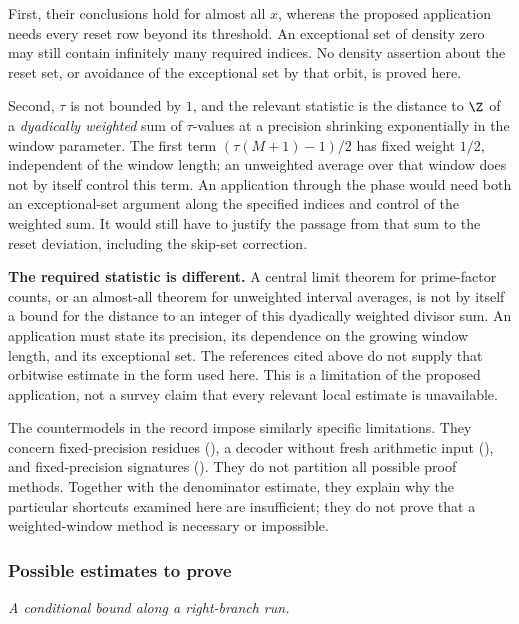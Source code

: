 First, their conclusions hold for almost all $x$, whereas the proposed
application needs every reset row beyond its threshold.  An
exceptional set of density zero may still contain infinitely many
required indices.  No density assertion about the reset set, or
avoidance of the exceptional set by that orbit, is proved here.

Second, $\tau$ is not bounded by $1$, and the relevant statistic is the distance to $\Z$ of a
\emph{dyadically weighted} sum of $\tau$-values at a precision shrinking exponentially in the window
parameter.  The first term $(\tau(M+1)-1)/2$ has fixed weight
$1/2$, independent of the window length; an unweighted average
over that window does not by itself control this term.  An application through the phase would need both an exceptional-set
argument along the specified indices and control of the weighted
sum.  It would still have to justify the passage from that sum to
the reset deviation, including the skip-set correction.

\textbf{The required statistic is different.} A central limit theorem
for prime-factor counts, or an almost-all theorem for unweighted
interval averages, is not by itself a bound for the distance to an
integer of this dyadically weighted divisor sum.  An application must
state its precision, its dependence on the growing window length,
and its exceptional set.  The references cited above do not supply
that orbitwise estimate in the form used here.  This is a limitation
of the proposed application, not a survey claim that every relevant
local estimate is unavailable.

The countermodels in the record impose similarly specific
limitations.  They concern fixed-precision residues
(),
a decoder without fresh arithmetic input
(),
and fixed-precision signatures
().
They do not partition all possible proof methods.  Together with the
denominator estimate, they explain why the particular shortcuts
examined here are insufficient; they do not prove that a
weighted-window method is necessary or impossible.

\subsubsection*{Possible estimates to prove}

\emph{A conditional bound along a right-branch run.}

